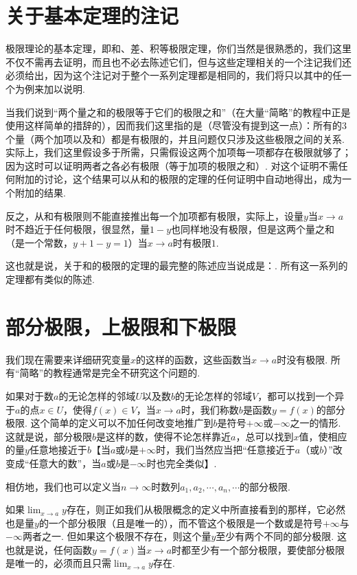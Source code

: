 \documentclass[color=cyan,mathpazo,titlestyle=hang]{elegantbook_mac}
\begin{document}
\section{关于基本定理的注记}

极限理论的基本定理，即和、差、积等极限定理，你们当然是很熟悉的，我们这里不仅不需再去证明，而且也不必去陈述它们，但与这些定理相关的一个注记我们还必须给出，因为这个注记对于整个一系列定理都是相同的，我们将只以其中的任一个为例来加以说明. 

当我们说到``两个量之和的极限等于它们的极限之和''（在大量``简略''的教程中正是使用这样简单的措辞的），因而我们这里指的是（尽管没有提到这一点）：所有的3个量（两个加项以及和）都是有极限的，并且问题仅只涉及这些极限之间的关系. 实际上，我们这里假设多于所需，只需假设这两个加项每一项都存在极限就够了；因为这时可以证明两者之各必有极限（等于加项的极限之和）. 对这个证明不需任何附加的讨论，这个结果可以从和的极限的定理的任何证明中自动地得出，成为一个附加的结果. 

反之，从和有极限则不能直接推出每一个加项都有极限，实际上，设量$y$当$x\to a$时不趋近于任何极限，很显然，量$1-y$也同样地没有极限，但是这两个量之和（是一个常数，$y+1-y=1$）当$x\to a$时有极限$1$.

这也就是说，关于和的极限的定理的最完整的陈述应当说成是：. 所有这一系列的定理都有类似的陈述.

\section{部分极限，上极限和下极限}

我们现在需要来详细研究变量$x$的这样的函数，这些函数当$x\to a$时没有极限. 所有``简略''的教程通常是完全不研究这个问题的. 

如果对于数$a$的无论怎样的邻域$U$以及数$b$的无论怎样的邻域$V$，都可以找到一个异于$a$的点$x\in U$，使得$f(x)\in V$，当$x\to a$时，我们称数$b$是函数$y=f(x)$的部分极限. 这个简单的定义可以不加任何改变地推广到$b$是符号$+\infty$或$-\infty$之一的情形. 这就是说，部分极限$b$是这样的数，使得不论怎样靠近$a$，总可以找到$x$值，使相应的量$y$任意地接近于$b$【当$a$或$b$是$+\infty$时，我们当然应当把``任意接近于$a$（或$b$）''改变成``任意大的数''，当$a$或$b$是$-\infty$时也完全类似】.

相仿地，我们也可以定义当$n\to \infty$时数列$a_1,a_2,\cdots,a_n,\cdots$的部分极限. 

如果$\lim_{x\to a}y$存在，则正如我们从极限概念的定义中所直接看到的那样，它必然也是量$y$的一个部分极限（且是唯一的），而不管这个极限是一个数或是符号$+\infty$与$-\infty$两者之一. 但如果这个极限不存在，则这个量$y$至少有两个不同的部分极限. 这也就是说，任何函数$y=f(x)$当$x\to a$时都至少有一个部分极限，要使部分极限是唯一的，必须而且只需$\lim_{x\to a}y$存在. 
\end{document}
